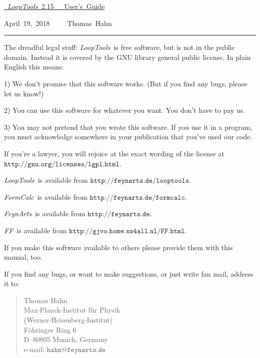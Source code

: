 \documentclass[twoside,12pt]{report}
\def\FA{\textit{FeynArts}}
\def\FC{\textit{FormCalc}}
\def\FF{\textit{FF}}
\def\LT{\textit{LoopTools}}
\def\Code#1{\ensuremath{\texttt{#1}}}
\begin{document}
\thispagestyle{empty}

\vspace*{.7\textheight}

\hfill\hbox{\underline{%
\vrule width 0pt height 0pt depth 2ex%
\Huge \LT~2.15~~~User's Guide}}

\vspace*{1ex}

\hfill\hbox{April 19, 2018~~~~~Thomas Hahn}

\clearpage

\vspace*{.5\textheight}
\vfill

\hrule

\medskip

\begin{scriptsize}
The dreadful legal stuff:
\LT\ is free software, but is not in the public domain.
Instead it is covered by the GNU library general public license.
In plain English this means:

1) We don't promise that this software works.   
(But if you find any bugs, please let us know!)

2) You can use this software for whatever you want.
You don't have to pay us.

3) You may not pretend that you wrote this software.
If you use it in a program, you must acknowledge
somewhere in your publication that you've used  
our code.

If you're a lawyer, you will rejoice at the exact wording of the license 
at \Code{http://gnu.org/licenses/lgpl.html}.

\LT\ is available from \Code{http://feynarts.de/looptools}.

\FC\ is available from \Code{http://feynarts.de/formcalc}.

\FA\ is available from \Code{http://feynarts.de}.

\FF\ is available from \Code{http://gjvo.home.xs4all.nl/FF.html}.

If you make this software available to others please provide them with
this manual, too.

If you find any bugs, or want to make suggestions, or just write fan mail,
address it to:
\vspace*{-2ex}
\begin{quote}
Thomas Hahn \\
Max-Planck-Institut f\"ur Physik \\
(Werner-Heisenberg-Institut) \\
F\"ohringer Ring 6 \\
D--80805 Munich, Germany \\
e-mail: \Code{hahn@feynarts.de}
\end{quote}
\end{scriptsize}
\end{document}
